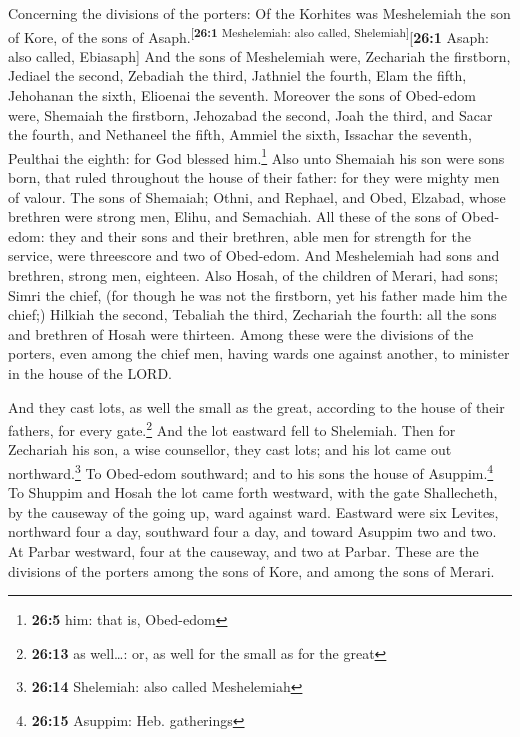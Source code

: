  Concerning the divisions of the porters: Of the Korhites
was Meshelemiah the son of Kore, of the sons of
Asaph.\textsuperscript{{[}\textbf{26:1} Meshelemiah: also called,
Shelemiah{]}}{[}\textbf{26:1} Asaph: also called, Ebiasaph{]}
 And the sons of Meshelemiah were, Zechariah the
firstborn, Jediael the second, Zebadiah the third, Jathniel the fourth,
 Elam the fifth, Jehohanan the sixth, Elioenai the
seventh.  Moreover the sons of Obed-edom were, Shemaiah
the firstborn, Jehozabad the second, Joah the third, and Sacar the
fourth, and Nethaneel the fifth,  Ammiel the sixth,
Issachar the seventh, Peulthai the eighth: for God blessed
him.\footnote{\textbf{26:5} him: that is, Obed-edom}  Also
unto Shemaiah his son were sons born, that ruled throughout the house of
their father: for they were mighty men of valour.  The
sons of Shemaiah; Othni, and Rephael, and Obed, Elzabad, whose brethren
were strong men, Elihu, and Semachiah.  All these of the
sons of Obed-edom: they and their sons and their brethren, able men for
strength for the service, were threescore and two of Obed-edom.
 And Meshelemiah had sons and brethren, strong men,
eighteen.  Also Hosah, of the children of Merari, had
sons; Simri the chief, (for though he was not the firstborn, yet his
father made him the chief;)  Hilkiah the second, Tebaliah
the third, Zechariah the fourth: all the sons and brethren of Hosah were
thirteen.  Among these were the divisions of the porters,
even among the chief men, having wards one against another, to minister
in the house of the LORD.

 And they cast lots, as well the small as the great,
according to the house of their fathers, for every gate.\footnote{\textbf{26:13}
  as well\ldots: or, as well for the small as for the great}
 And the lot eastward fell to Shelemiah. Then for
Zechariah his son, a wise counsellor, they cast lots; and his lot came
out northward.\footnote{\textbf{26:14} Shelemiah: also called
  Meshelemiah}  To Obed-edom southward; and to his sons
the house of Asuppim.\footnote{\textbf{26:15} Asuppim: Heb. gatherings}
 To Shuppim and Hosah the lot came forth westward, with
the gate Shallecheth, by the causeway of the going up, ward against
ward.  Eastward were six Levites, northward four a day,
southward four a day, and toward Asuppim two and two.  At
Parbar westward, four at the causeway, and two at Parbar.
 These are the divisions of the porters among the sons of
Kore, and among the sons of Merari.

